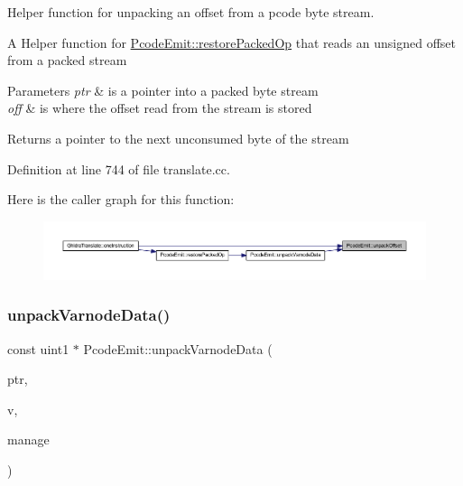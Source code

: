 Helper function for unpacking an offset from a pcode byte stream. 

A Helper function for \mbox{\hyperlink{class_pcode_emit_a8136f8c678e250f77907ed57dc6956ac}{Pcode\+Emit\+::restore\+Packed\+Op}} that reads an unsigned offset from a packed stream 
\begin{DoxyParams}{Parameters}
{\em ptr} & is a pointer into a packed byte stream \\
\hline
{\em off} & is where the offset read from the stream is stored \\
\hline
\end{DoxyParams}
\begin{DoxyReturn}{Returns}
a pointer to the next unconsumed byte of the stream 
\end{DoxyReturn}


Definition at line 744 of file translate.\+cc.

Here is the caller graph for this function\+:
\nopagebreak
\begin{figure}[H]
\begin{center}
\leavevmode
\includegraphics[width=350pt]{class_pcode_emit_a58dbf8967eef54f79f9e622b69df46a5_icgraph}
\end{center}
\end{figure}
\mbox{\label{class_pcode_emit_aa5c98b5fd60bc78f36de44f6fa20dde7}} 
\subsubsection{\texorpdfstring{unpackVarnodeData()}{unpackVarnodeData()}}
{\footnotesize\ttfamily const uint1 $\ast$ Pcode\+Emit\+::unpack\+Varnode\+Data (\begin{DoxyParamCaption}\item[{const uint1 $\ast$}]{ptr,  }\item[{\mbox{\hyperlink{struct_varnode_data}{Varnode\+Data}} \&}]{v,  }\item[{const \mbox{\hyperlink{class_addr_space_manager}{Addr\+Space\+Manager}} $\ast$}]{manage }\end{DoxyParamCaption})\hspace{0.3cm}{\ttfamily [static]}}



